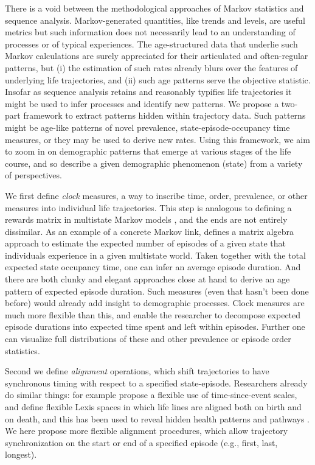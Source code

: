 \documentclass{article}
\begin{document}
There is a void between the methodological approaches of Markov statistics and sequence analysis. Markov-generated quantities, like trends and levels, are useful metrics but such information does not necessarily lead to an understanding of processes or of typical experiences. The age-structured data that underlie such Markov calculations are surely appreciated for their articulated and often-regular patterns, but (i) the estimation of such rates already blurs over the features of underlying life trajectories, and (ii) such age patterns serve the objective statistic. Insofar as sequence analysis retains and reasonably typifies life trajectories it might be used to infer processes and identify new patterns. We propose a two-part framework to extract patterns hidden within trajectory data. Such patterns might be age-like patterns of novel prevalence, state-episode-occupancy time measures, or they may be used to derive new rates. Using this framework, we aim to zoom in on demographic patterns that emerge at various stages of the life course, and so describe a given demographic phenomenon (state) from a variety of perspectives. 

We first define \emph{clock} measures, a way to inscribe time, order, prevalence, or other measures into individual life trajectories. This step is analogous to defining a rewards matrix in multistate Markov models \citep[see e.g.][]{caswell2018matrix}, and the ends are not entirely dissimilar. As an example of a concrete Markov link, \citet{dudel2017b} defines a matrix algebra approach to estimate the expected number of episodes of a given state that individuals experience in a given multistate world. Taken together with the total expected state occupancy time, one can infer an average episode duration. And there are both clunky and elegant approaches close at hand to derive an age pattern of expected episode duration. Such measures (even that hasn't been done before) would already add insight to demographic processes. Clock measures are much more flexible than this, and enable the researcher to decompose expected episode durations into expected time spent and left within episodes. Further one can visualize full distributions of these and other prevalence or episode order statistics.

Second we define \emph{alignment} operations, which shift trajectories to have synchronous timing with respect to a specified state-episode. Researchers already do similar things: for example \citet{iacobelli2013multiple} propose a flexible use of time-since-event scales, and \citet{riffe2017unified} define flexible Lexis spaces in which life lines are aligned both on birth and on death, and this has been used to reveal hidden health patterns \citep{riffe2016time} and pathways \citep{potente2018disability, raab2018pathways}. We here propose more flexible alignment procedures, which allow trajectory synchronization on the start or end of a specified episode (e.g., first, last, longest).
\end{document}
